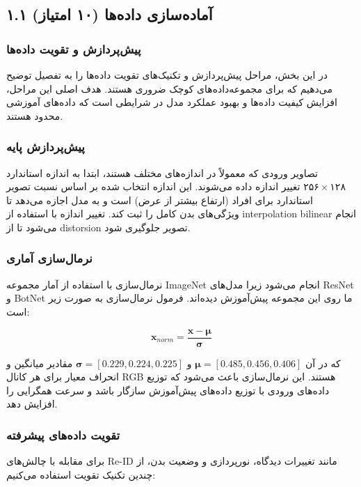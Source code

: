 \documentclass[12pt,a4paper]{article}
\theoremstyle{definition}
\begin{document}
\subsection{۱.۱ آماده‌سازی داده‌ها (۱۰ امتیاز)}

\subsubsection*{پیش‌پردازش و تقویت داده‌ها}
در این بخش، مراحل پیش‌پردازش و تکنیک‌های تقویت داده‌ها را به تفصیل توضیح می‌دهیم که برای مجموعه‌داده‌های کوچک ضروری هستند. هدف اصلی این مراحل، افزایش کیفیت داده‌ها و بهبود عملکرد مدل در شرایطی است که داده‌های آموزشی محدود هستند.

\subsubsection*{پیش‌پردازش پایه}
تصاویر ورودی که معمولاً در اندازه‌های مختلف هستند، ابتدا به اندازه استاندارد $۲۵۶ \times ۱۲۸$ تغییر اندازه داده می‌شوند. این اندازه انتخاب شده بر اساس نسبت تصویر استاندارد برای افراد (ارتفاع بیشتر از عرض) است و به مدل اجازه می‌دهد تا ویژگی‌های بدن کامل را ثبت کند. تغییر اندازه با استفاده از interpolation bilinear انجام می‌شود تا از distorsion تصویر جلوگیری شود.

\subsubsection*{نرمال‌سازی آماری}
نرمال‌سازی با استفاده از آمار مجموعه ImageNet انجام می‌شود زیرا مدل‌های ResNet و BotNet ما روی این مجموعه پیش‌آموزش دیده‌اند. فرمول نرمال‌سازی به صورت زیر است:

\[
\mathbf{x}_{norm} = \frac{\mathbf{x} - \boldsymbol{\mu}}{\boldsymbol{\sigma}}
\]

که در آن $\boldsymbol{\mu} = [0.485, 0.456, 0.406]$ و $\boldsymbol{\sigma} = [0.229, 0.224, 0.225]$ مقادیر میانگین و انحراف معیار برای هر کانال RGB هستند. این نرمال‌سازی باعث می‌شود که توزیع داده‌های ورودی با توزیع داده‌های پیش‌آموزش سازگار باشد و سرعت همگرایی را افزایش دهد.

\subsubsection*{تقویت داده‌های پیشرفته}
برای مقابله با چالش‌های Re-ID مانند تغییرات دیدگاه، نورپردازی و وضعیت بدن، از چندین تکنیک تقویت استفاده می‌کنیم:
\end{document}
